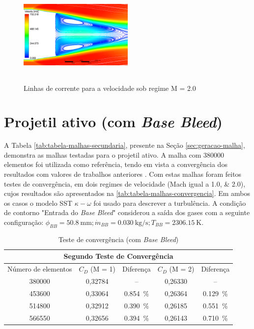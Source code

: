 \begin{figure}[!ht]
    \centering
    \includegraphics[height=5cm,width=0.5\textwidth]{corrente-velocidade-off.png}
    \caption{Linhas de corrente para a velocidade sob regime M = \num{2,0}}
    \label{fig:corrente-velocidade-sembasebleed}
\end{figure}

\section{Projetil ativo (com \textit{Base Bleed})}\label{sec:resultados-com-basebleed}

A Tabela \ref{tab:tabela-malhas-secundaria}, presente na Seção \ref{sec:geracao-malha}, demonstra as malhas testadas para o projetil ativo. A malha com \num{380000} elementos foi utilizada como referência, tendo em vista a convergência dos resultados com valores de trabalhos anteriores \cite{Mahmoud2009}. Com estas malhas foram feitos testes de convergência, em dois regimes de velocidade (Mach igual a \numlist{1,0;2,0}), cujos resultados são apresentados na \autoref{tab:tabela-malhas-convergencia}. Em ambos os casos o modelo SST \(\kappa-\omega\) foi usado para descrever a turbulência. A condição de contorno "Entrada do \textit{Base Bleed}"{} considerou a saída dos gases com a seguinte configuração: \(\phi_{BB} = \qty{50,8}{\milli\metre}; \Dot{m}_{BB} = \qty{0,030}{\kilogram\per\second}; T_{BB} = \qty{2306,15}{\kelvin}\).

\begin{table}[ht]
\centering
\caption[Teste de convergência (com \textit{Base Bleed})]{Teste de convergência (com \textit{Base Bleed})}
\vspace{0.5cm}
\begin{tabular}{c|c|c|c|c}
\multicolumn{5}{c}{Segundo Teste de Convergência} \\
\hline 
Número de elementos & \(C_{D}\) (M = \num{1}) & Diferença & \(C_{D}\) (M = \num{2}) & Diferença\\ 
\hline
\num{380000} & 0,32784 & -- & 0,26330 & --\\
\num{453600} & 0,33064 & \qty{0,854}{\percent} & 0,26364 & \qty{0,129}{\percent}\\
\num{514800} & 0,32912 & \qty{0,390}{\percent} & 0,26185 & \qty{0,551}{\percent}\\
\num{566550} & 0,32656 & \qty{0,394}{\percent} & 0,26143 & \qty{0,710}{\percent}\\
\end{tabular}
\label{tab:tabela-malhas-convergencia}
\end{table}

